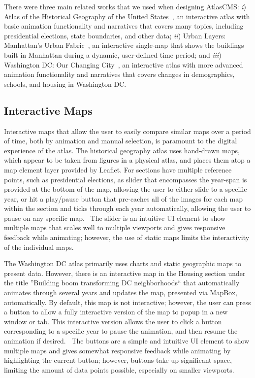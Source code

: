 \documentclass[11pt, draftcls, conference, onecolumn]{IEEEtran}
\begin{document}
There were three main related works that we used when designing AtlasCMS: {\it i}) Atlas of the Historical Geography of the United States~\cite{us-historical-atlas-2014}, an interactive atlas with basic animation functionality and narratives that covers many topics, including presidential elections, state boundaries, and other data; {\it ii}) Urban Layers: Manhattan's Urban Fabric~\cite{urban-layers-2014}, an interactive single-map that shows the buildings built in Manhattan during a dynamic, user-defined time period; and {\it iii}) Washington DC: Our Changing City~\cite{dc-changing-2014}, an interactive atlas with more advanced animation functionality and narratives that covers changes in demographics, schools, and housing in Washington DC.

\subsection{Interactive Maps}
Interactive maps that allow the user to easily compare similar maps over a period of time, both by animation and manual selection, is paramount to the digital experience of the atlas. The historical geography atlas uses hand-drawn maps, which appear to be taken from figures in a physical atlas, and places them atop a map element layer provided by Leaflet. For sections have multiple reference points, such as presidential elections, as slider that encompasses the year-span is provided at the bottom of the map, allowing the user to either slide to a specific year, or hit a play/pause button that pre-caches all of the images for each map within the section and ticks through each year automatically, allowing the user to pause on any specific map.~\cite{us-historical-atlas-2014} The slider is an intuitive UI element to show multiple maps that scales well to multiple viewports and gives responsive feedback while animating; however, the use of static maps limits the interactivity of the individual maps.

The Washington DC atlas primarily uses charts and static geographic maps to present data. However, there is an interactive map in the Housing section under the title ''Building boom transforming DC neighborhoods`` that automatically animates through several years and updates the map, presented via MapBox, automatically. By default, this map is not interactive; however, the user can press a button to allow a fully interactive version of the map to popup in a new window or tab. This interactive version allows the user to click a button corresponding to a specific year to pause the animation, and then resume the animation if desired.~\cite{dc-changing-2014} The buttons are a simple and intuitive UI element to show multiple maps and gives somewhat responsive feedback while animating by highlighting the current button; however, buttons take up significant space, limiting the amount of data points possible, especially on smaller viewports.
\end{document}
